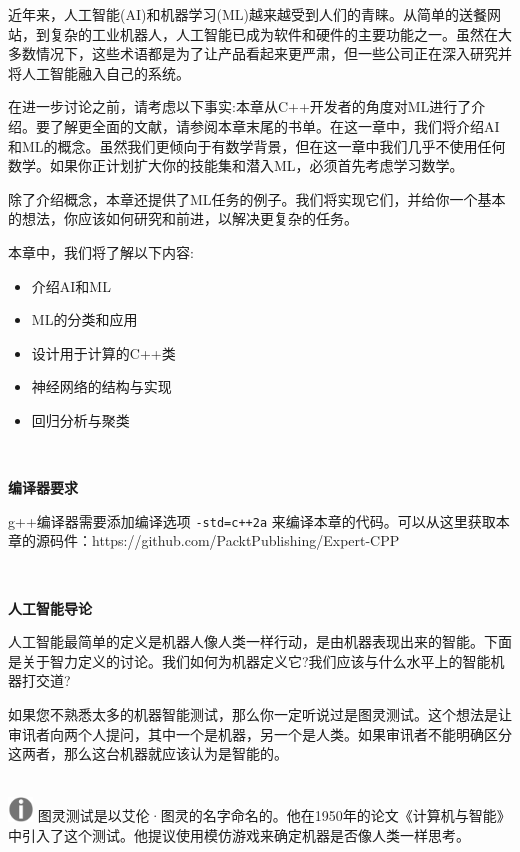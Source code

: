 近年来，人工智能(AI)和机器学习(ML)越来越受到人们的青睐。从简单的送餐网站，到复杂的工业机器人，人工智能已成为软件和硬件的主要功能之一。虽然在大多数情况下，这些术语都是为了让产品看起来更严肃，但一些公司正在深入研究并将人工智能融入自己的系统。 \par
在进一步讨论之前，请考虑以下事实:本章从C++开发者的角度对ML进行了介绍。要了解更全面的文献，请参阅本章末尾的书单。在这一章中，我们将介绍AI和ML的概念。虽然我们更倾向于有数学背景，但在这一章中我们几乎不使用任何数学。如果你正计划扩大你的技能集和潜入ML，必须首先考虑学习数学。 \par
除了介绍概念，本章还提供了ML任务的例子。我们将实现它们，并给你一个基本的想法，你应该如何研究和前进，以解决更复杂的任务。 \par

本章中，我们将了解以下内容: \par

\begin{itemize}
	\item 介绍AI和ML
	\item ML的分类和应用
	\item 设计用于计算的C++类
	\item 神经网络的结构与实现
	\item 回归分析与聚类
\end{itemize}

\noindent\textbf{}\ \par
\textbf{编译器要求} \ \par
g++编译器需要添加编译选项 \texttt{-std=c++2a} 来编译本章的代码。可以从这里获取本章的源码件：https:/​/github.​com/PacktPublishing/Expert-CPP \par

\noindent\textbf{}\ \par
\textbf{人工智能导论} \ \par
人工智能最简单的定义是机器人像人类一样行动，是由机器表现出来的智能。下面是关于智力定义的讨论。我们如何为机器定义它?我们应该与什么水平上的智能机器打交道? \par
如果您不熟悉太多的机器智能测试，那么你一定听说过是图灵测试。这个想法是让审讯者向两个人提问，其中一个是机器，另一个是人类。如果审讯者不能明确区分这两者，那么这台机器就应该认为是智能的。 \par

\hspace*{\fill} \\ %
\includegraphics[width=0.05\textwidth]{images/warn}
图灵测试是以艾伦·图灵的名字命名的。他在1950年的论文《计算机与智能》中引入了这个测试。他提议使用模仿游戏来确定机器是否像人类一样思考。 \par
\noindent\textbf{}\ \par

